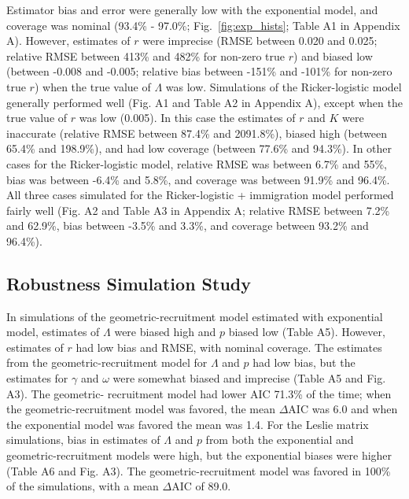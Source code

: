 \documentclass[12pt,english]{article}
\begin{document}
\begin{spacing}{1.9}
\begin{flushleft}
Estimator bias and error were generally low with the exponential model, and 
coverage was nominal (93.4\% - 97.0\%; Fig.~\ref{fig:exp_hists}; Table A1 in Appendix A). 
However, estimates of $r$ were 
imprecise (RMSE between 0.020 and 0.025; relative RMSE between 413\% and 
482\% for non-zero true $r$) and biased low (between -0.008 and -0.005; relative bias between
-151\% and -101\% for non-zero true $r$) when the true value of
$\Lambda$ was low. 
Simulations of the Ricker-logistic model 
generally performed well (Fig. A1 and Table A2 in Appendix A), except when the true value of $r$ was low (0.005). In this case the 
estimates of $r$ and $K$ were inaccurate (relative RMSE between 87.4\% and 2091.8\%),
biased high (between 65.4\% and 198.9\%), and had low coverage (between 77.6\% and 94.3\%).
In other cases for the Ricker-logistic model, relative RMSE was between 6.7\%
and 55\%, bias was between -6.4\% and 5.8\%, and coverage was between
91.9\% and 96.4\%.  All three cases simulated for the Ricker-logistic + immigration model 
performed fairly well (Fig. A2 and Table A3 in Appendix A; relative RMSE between 7.2\% 
and 62.9\%, bias between -3.5\% and 3.3\%, and coverage between
93.2\% and 96.4\%).  
  
\subsection*{Robustness Simulation Study}
In simulations of the geometric-recruitment model estimated with exponential model,
estimates of $\Lambda$ were biased high %
and $p$ biased low (Table A5). %
However, estimates of $r$ had low bias %
and RMSE, %
with nominal coverage. %
The estimates from the geometric-recruitment model for $\Lambda$ and $p$ had low bias, but the estimates
for $\gamma$ and $\omega$ were somewhat biased and imprecise (Table A5 and Fig. A3).
The geometric- recruitment model had lower
AIC 71.3\% of the time; when the geometric-recruitment model was favored, the
mean $\Delta$AIC was 6.0 and when the exponential model was favored
the mean was 1.4.  %
For the Leslie matrix simulations, bias in estimates of $\Lambda$ and $p$ from both the exponential and geometric-recruitment models
were high, but the exponential biases were higher (Table A6 and Fig. A3).  
The geometric-recruitment model was favored in 100\% of the simulations, 
with a mean $\Delta$AIC of 89.0.  


\end{flushleft}
\end{spacing}
\end{document}
